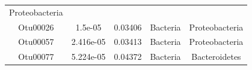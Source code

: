 \documentclass[]{article}
\begin{document}
\begin{longtable}[]{@{}ccccc@{}}
\begin{minipage}[t]{0.27\columnwidth}
Proteobacteria\strut
\end{minipage}\tabularnewline
\begin{minipage}[t]{0.13\columnwidth}\centering\strut
Otu00026\strut
\end{minipage} & \begin{minipage}[t]{0.14\columnwidth}\centering\strut
1.5e-05\strut
\end{minipage} & \begin{minipage}[t]{0.13\columnwidth}\centering\strut
0.03406\strut
\end{minipage} & \begin{minipage}[t]{0.13\columnwidth}\centering\strut
Bacteria\strut
\end{minipage} & \begin{minipage}[t]{0.27\columnwidth}\centering\strut
Proteobacteria\strut
\end{minipage}\tabularnewline
\begin{minipage}[t]{0.13\columnwidth}\centering\strut
Otu00057\strut
\end{minipage} & \begin{minipage}[t]{0.14\columnwidth}\centering\strut
2.416e-05\strut
\end{minipage} & \begin{minipage}[t]{0.13\columnwidth}\centering\strut
0.03413\strut
\end{minipage} & \begin{minipage}[t]{0.13\columnwidth}\centering\strut
Bacteria\strut
\end{minipage} & \begin{minipage}[t]{0.27\columnwidth}\centering\strut
Proteobacteria\strut
\end{minipage}\tabularnewline
\begin{minipage}[t]{0.13\columnwidth}\centering\strut
Otu00077\strut
\end{minipage} & \begin{minipage}[t]{0.14\columnwidth}\centering\strut
5.224e-05\strut
\end{minipage} & \begin{minipage}[t]{0.13\columnwidth}\centering\strut
0.04372\strut
\end{minipage} & \begin{minipage}[t]{0.13\columnwidth}\centering\strut
Bacteria\strut
\end{minipage} & \begin{minipage}[t]{0.27\columnwidth}\centering\strut
Bacteroidetes\strut
\end{minipage}\tabularnewline

\end{longtable}
\end{document}
